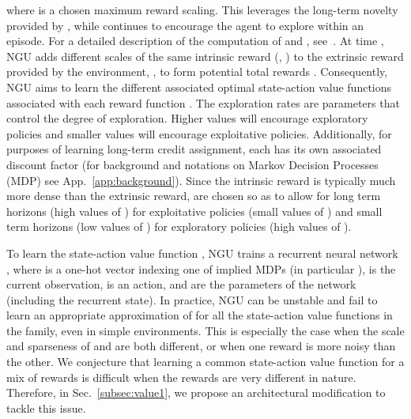 \documentclass{article}
\begin{document}
where  is a chosen maximum reward scaling. This leverages the long-term novelty provided by , while  continues to encourage the agent to explore within an episode. For a detailed description of the computation of  and , see~\citep{badia2020never}.
At time , NGU adds  different scales of the same intrinsic reward  (, ) to the extrinsic reward provided by the environment, , to form  potential total rewards . Consequently, NGU aims to learn the  different associated optimal state-action value functions  associated with each reward function . The exploration rates  are parameters that control the degree of exploration. Higher values will encourage exploratory policies and smaller values will encourage exploitative policies.
Additionally, for purposes of learning long-term credit assignment, each  has its own associated discount factor  (for background and notations on Markov Decision Processes (MDP) see App.~\ref{app:background}). Since the intrinsic reward is typically much more dense than the extrinsic reward,  are chosen so as to allow for long term horizons (high values of ) for exploitative policies (small values of ) and small term horizons (low values of ) for exploratory policies (high values of ).

To learn the state-action value function , NGU trains a recurrent neural network , where  is a one-hot vector indexing one of  implied MDPs (in particular ),  is the current observation,  is an action, and  are the parameters of the network (including the recurrent state).
In practice, NGU can be unstable and fail to learn an appropriate approximation of  for all the state-action value functions in the family, even in simple environments. This is especially the case when the scale and sparseness of  and  are both different, or when one reward is more noisy than the other. We conjecture that learning a common state-action value function for a mix of rewards is difficult when the rewards are very different in nature. Therefore, in Sec.~\ref{subsec:value1}, we propose an architectural modification to tackle this issue.
\end{document}
